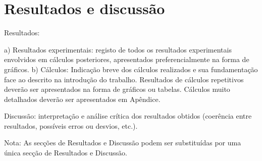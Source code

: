 \section{Resultados e discussão}

Resultados:

a) Resultados experimentais: registo de todos os resultados experimentais envolvidos em  cálculos posteriores, apresentados preferencialmente na forma de gráficos.
b) Cálculos: Indicação breve dos cálculos realizados e sua fundamentação face ao descrito na introdução do trabalho. Resultados de cálculos repetitivos deverão ser apresentados na forma  de gráficos ou tabelas. Cálculos muito detalhados deverão ser apresentados em Apêndice.

Discussão: interpretação e análise crítica dos resultados obtidos (coerência entre resultados,  possíveis erros ou desvios, etc.).

Nota: As secções de Resultados e Discussão podem ser substituídas por uma única secção de  Resultados e Discussão.